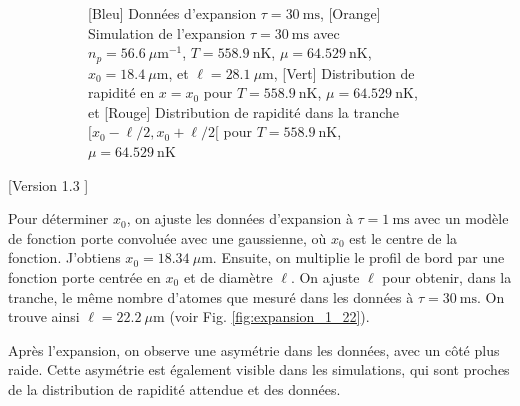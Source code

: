 \documentclass[a3, 10pt,twoside]{article}          %
\theoremstyle{plain}
\theoremstyle{definition}
\theoremstyle{remark}
\theoremstyle{definition} %
\begin{document}
\begin{figure}[H]
\begin{subfigure}[b]{0.45\textwidth}
        \caption{{\color{blue}[Bleu] Données d'expansion $\tau = 30~\text{ms}$}, {\color{orange}[Orange] Simulation de l'expansion $\tau = 30~\text{ms}$ avec $n_p = 56.6~\mu \text{m}^{-1}$, $T = 558.9~\text{nK}$, $\mu = 64.529~\text{nK}$, $x_0 = 18.4~\mu \text{m}$, et $\ell = 28.1~\mu \text{m}$}, {\color{OliveGreen}[Vert] Distribution de rapidité en $x = x_0$ pour $T = 558.9~\text{nK}$, $\mu = 64.529~\text{nK}$}, et {\color{red}[Rouge] Distribution de rapidité dans la tranche $[x_0 - \ell/2, x_0 + \ell/2 [$ pour $T = 558.9~\text{nK}$, $\mu = 64.529~\text{nK}$}}
        \label{fig:expansion_30_28}
    \end{subfigure}
    \caption{}
    \label{}
\end{figure}

	
		
	[Version 1.3 ]
	
	Pour déterminer $x_0$, on ajuste les données d'expansion à $\tau = 1~\text{ms}$ avec un modèle de fonction porte convoluée avec une gaussienne, où $x_0$ est le centre de la fonction. J'obtiens $x_0 = 18.34~\mu \text{m}$. Ensuite, on multiplie le profil de bord par une fonction porte centrée en $x_0$ et de diamètre $\ell$. On ajuste $\ell$ pour obtenir, dans la tranche, le même nombre d'atomes que mesuré dans les données à $\tau = 30~\text{ms}$. On trouve ainsi $\ell = 22.2~\mu \text{m}$ (voir Fig. \ref{fig:expansion_1_22}).

Après l'expansion, on observe une asymétrie dans les données, avec un côté plus raide. Cette asymétrie est également visible dans les simulations, qui sont proches de la distribution de rapidité attendue et des données.
\end{document}
